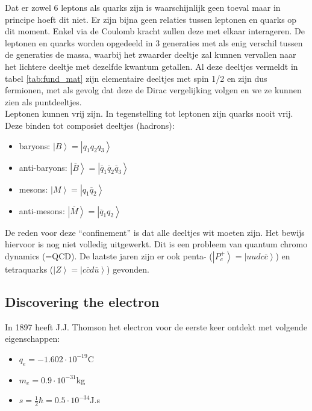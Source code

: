\documentclass[../main.tex]{subfiles}
\begin{document}
Dat er zowel 6 leptons als quarks zijn is waarschijnlijk geen toeval maar in principe hoeft dit niet. Er zijn bijna geen relaties tussen leptonen en quarks op dit moment. Enkel via de Coulomb kracht zullen deze met elkaar interageren. De leptonen en quarks worden opgedeeld in 3 generaties met als enig verschil tussen de generaties de massa, waarbij het zwaarder deeltje zal kunnen vervallen naar het lichtere deeltje met dezelfde kwantum getallen. Al deze deeltjes vermeldt in tabel \ref{tab:fund_mat} zijn elementaire deeltjes met spin 1/2 en zijn dus fermionen, met als gevolg dat deze de Dirac vergelijking volgen en we ze kunnen zien als puntdeeltjes.\\
Leptonen kunnen vrij zijn. In tegenstelling tot leptonen zijn quarks nooit vrij. Deze binden tot composiet deeltjes (hadrons):

\begin{itemize}
    \item baryons: $\left|B\right>=\left|q_1q_2q_3\right>$
    \item anti-baryons: $\left|\overline B\right>=\left|\overline q_1\overline q_2\overline q_3\right>$
    \item mesons: $\left|M\right>=\left|q_1\overline q_2\right>$
    \item anti-mesons: $\left|\overline M\right>=\left|\overline q_1 q_2\right>$
\end{itemize}

De reden voor deze ``confinement'' is dat alle deeltjes wit moeten zijn. Het bewijs hiervoor is nog niet volledig uitgewerkt. Dit is een probleem van quantum chromo dynamics (=QCD). De laatste jaren zijn er ook penta- ($\left|P_c^+\right>=\left|uudc\overline c\right>$) en tetraquarks ($\left|Z\right>=\left|c\overline c d\overline u\right>$) gevonden.

\subsection{Discovering the electron}%
\label{sub:discovering_the_electron}

In 1897 heeft J.J. Thomson het electron voor de eerste keer ontdekt met volgende eigenschappen:
\begin{itemize}
    \item $q_e = -1.602\cdot 10^{-19}$C
    \item $m_e = 0.9\cdot 10^{-31}$kg
    \item $s = \frac{1}{2}\hbar = 0.5\cdot 10^{-34}$J.s
\end{itemize}
\end{document}
